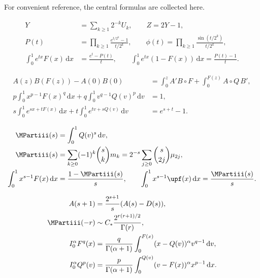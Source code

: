 \documentclass[11pt,oneside]{article}
\theoremstyle{definition}
\theoremstyle{remark}
\newcommand{\F}{F}
\newcommand{\Q}{Q}
\newcommand{\dd}{\,\mathrm d}
\newcommand{\1}{\mathbf 1}
\begin{document}
For convenient reference, the central formulas are collected here.

\begin{resultbox}
\begin{align*}
 Y&=\sum_{k\ge1}2^{-k}U_k,\qquad Z=2Y-1,\\
 P(t)&=\prod_{k\ge1}\frac{e^{t/2^k}-1}{t/2^k},\qquad
 \phi(t)=\prod_{k\ge1}\frac{\sin(t/2^k)}{t/2^k},\\
 \int_0^1e^{tx}\F(x)\dd x&=\frac{e^t-P(t)}t,\qquad
 \int_0^1e^{tx}(1-\F(x))\dd x=\frac{P(t)-1}t.
\end{align*}
\end{resultbox}

\begin{resultbox}
\begin{align*}
 A(z)B(\F(z))-A(0)B(0)
 &=\int_0^zA'B\circ\F
 +\int_0^{\F(z)}A\circ\Q\,B',\\
 p\int_0^1x^{p-1}\F(x)^q\dd x
 +q\int_0^1v^{q-1}\Q(v)^p\dd v&=1,\\
 s\int_0^1e^{sx+t\F(x)}\dd x
 +t\int_0^1e^{tv+s\Q(v)}\dd v&=e^{s+t}-1.
\end{align*}
\end{resultbox}

\begin{resultbox}
\begin{align*}
 \MPartiii(s)&=\int_0^1\Q(v)^s\dd v,\\
 \MPartiii(s)&=\sum_{k\ge0}(-1)^k\binom skm_k
 =2^{-s}\sum_{j\ge0}\binom{s}{2j}\mu_{2j},\\
 \int_0^1x^{s-1}\F(x)\dd x&=\frac{1-\MPartiii(s)}s,\qquad
 \int_0^1x^{s-1}\upf(x)\dd x=\frac{\MPartiii(s)}s.
\end{align*}
\end{resultbox}

\begin{resultbox}
\begin{align*}
 A(s+1)&=\frac{2^{s+1}}s(A(s)-D(s)),\\
 \MPartiii(-r)&\sim C_*\frac{2^{r(r+1)/2}}{\Gamma(r)},\\
 I_0^\alpha\F^q(x)
 &=\frac{q}{\Gamma(\alpha+1)}
 \int_0^{\F(x)}(x-\Q(v))^\alpha v^{q-1}\dd v,\\
 I_0^\alpha\Q^p(v)
 &=\frac{p}{\Gamma(\alpha+1)}
 \int_0^{\Q(v)}(v-\F(x))^\alpha x^{p-1}\dd x.
\end{align*}
\end{resultbox}
\end{document}
